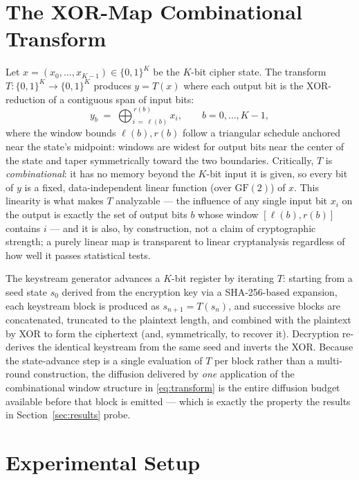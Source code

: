\documentclass[conference]{IEEEtran}
\begin{document}
\section{The XOR-Map Combinational Transform}
\label{sec:transform}

Let $x = (x_0, \dots, x_{K-1}) \in \{0,1\}^K$ be the $K$-bit cipher state.
The transform $T : \{0,1\}^K \to \{0,1\}^K$ produces $y = T(x)$ where each
output bit is the XOR-reduction of a contiguous span of input bits:
\begin{equation}
y_b \;=\; \bigoplus_{i \,=\, \ell(b)}^{\,r(b)} x_i, \qquad b = 0, \dots,
K-1,
\label{eq:transform}
\end{equation}
where the window bounds $\ell(b), r(b)$ follow a triangular schedule
anchored near the state's midpoint: windows are widest for output bits
near the center of the state and taper symmetrically toward the two
boundaries. Critically, $T$ is \emph{combinational}: it has no memory
beyond the $K$-bit input it is given, so every bit of $y$ is a fixed,
data-independent linear function (over $\mathrm{GF}(2)$) of $x$. This
linearity is what makes $T$ analyzable — the influence of any single input
bit $x_i$ on the output is exactly the set of output bits $b$ whose window
$[\ell(b), r(b)]$ contains $i$ — and it is also, by construction, not a
claim of cryptographic strength; a purely linear map is transparent to
linear cryptanalysis regardless of how well it passes statistical tests.

The keystream generator advances a $K$-bit register by iterating $T$:
starting from a seed state $s_0$ derived from the encryption key via a
SHA-256-based expansion, each keystream block is produced as $s_{n+1} =
T(s_n)$, and successive blocks are concatenated, truncated to the
plaintext length, and combined with the plaintext by XOR to form the
ciphertext (and, symmetrically, to recover it). Decryption re-derives the
identical keystream from the same seed and inverts the XOR. Because the
state-advance step is a single evaluation of $T$ per block rather than a
multi-round construction, the diffusion delivered by \emph{one}
application of the combinational window structure in
\eqref{eq:transform} is the entire diffusion budget available before that
block is emitted — which is exactly the property the results in
Section~\ref{sec:results} probe.

\section{Experimental Setup}
\label{sec:setup}
\end{document}
